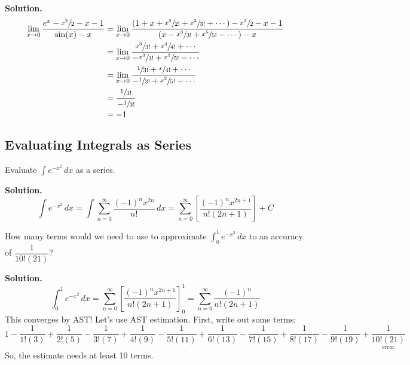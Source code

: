\begin{Example}{}{}
\begin{enumerate}[label=(\roman*)]
              \textbf{Solution.}
              \begin{align*}
                  \lim\limits_{{x} \to {0}} \frac{e^x-\sfrac{x^2}{2} -x-1}{\sin(x)-x}
                   & =\lim\limits_{{x} \to {0}}
                  \frac{\left( 1+x+\sfrac{x^2}{2!}+\sfrac{x^3}{3!}+\cdots \right)-
                      \sfrac{x^2}{2} -x-1}{\left( x-\sfrac{x^3}{3!} +\sfrac{x^5}{5!} -\cdots \right)-x}   \\
                   & =\lim\limits_{{x} \to {0}}
                  \frac{\sfrac{x^3}{3!} +\sfrac{x^4}{4!}+\cdots}{-\sfrac{x^3}{3!}+\sfrac{x^5}{5!}-\cdots} \\
                   & =\lim\limits_{{x} \to {0}}
                  \frac{\sfrac{1}{3!}+\sfrac{x}{4!}+\cdots}{-\sfrac{1}{3!}+\sfrac{x^2}{5!} -\cdots}       \\
                   & =\frac{\sfrac{1}{3!}  }{-\sfrac{1}{3!}  }                                            \\
                   & =-1
              \end{align*}
    \end{enumerate}
\end{Example}

\subsection*{Evaluating Integrals as Series}

\begin{Example}{}{}
    Evaluate $ \displaystyle \int e^{-x^2}\, d{x} $ as a series.

    \textbf{Solution.}
    \[ \int e^{-x^2}\, d{x}
        =\int \sum\limits_{n=0}^{\infty} \frac{(-1)^n x^{2n}}{n!} \, d{x}
        =\sum\limits_{n=0}^{\infty} \left[ \frac{(-1)^n x^{2n+1}}{n!(2n+1)} \right]+C \]
\end{Example}

\begin{Example}{}{}
    How many terms would we need to use to approximate
    $ \displaystyle \int_{0}^{1} e^{-x^2}\, d{x} $
    to an accuracy of $ \dfrac{1}{10!(21)} $?

    \textbf{Solution.}
    \[ \int_{0}^{1} e^{-x^2}\, d{x}
        = \sum\limits_{n=0}^{\infty}\left[ \frac{(-1)^n x^{2n+1}}{n!(2n+1)} \right]_0^1
        =\sum\limits_{n=0}^{\infty} \frac{(-1)^n}{n!(2n+1)}   \]
    This converges by AST\@! Let's use AST estimation. First, write out some terms:
    \[ 1-\frac{1}{1!(3)} +\frac{1}{2!(5)} -\frac{1}{3!(7)} +\frac{1}{4!(9)}-
        \frac{1}{5!(11)}+\frac{1}{6!(13)} -\frac{1}{7!(15)} +\frac{1}{8!(17)} -\frac{1}{9!(19)} +
        \underset{\text{error}}{\boxed{\frac{1}{10!(21)}}} \]
    So, the estimate needs at least 10 terms.
\end{Example}

